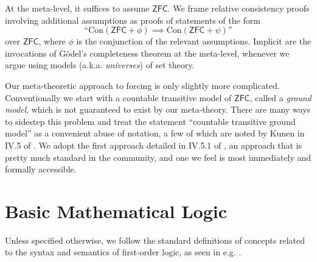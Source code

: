\documentclass[12pt, twoside]{memoir}
\numberwithin{equation}{section}
\theoremstyle{definition}
\theoremstyle{remark}
\theoremstyle{definition}
\theoremstyle{definition}
\theoremstyle{definition}
\theoremstyle{remark}
\begin{document}
At the meta-level, it suffices to assume $\mathsf{ZFC}$. We frame relative consistency proofs involving additional assumptions as proofs of statements of the form $$\text{``}\mathrm{Con}(\mathsf{ZFC} + \phi) \implies \mathrm{Con}(\mathsf{ZFC} + \psi)\text{''}$$ over $\mathsf{ZFC}$, where $\phi$ is the conjunction of the relevant assumptions. Implicit are the invocations of G\"{o}del's completeness theorem at the meta-level, whenever we argue using models (a.k.a. \emph{universes}) of set theory.

Our meta-theoretic approach to forcing is only slightly more complicated. Conventionally we start with a countable transitive model of $\mathsf{ZFC}$, called a \emph{ground model}, which is not guaranteed to exist by our meta-theory. There are many ways to sidestep this problem and treat the statement ``countable transitive ground model'' as a convenient abuse of notation, a few of which are noted by Kunen in IV.5 of \cite{kunen}. We adopt the first approach detailed in IV.5.1 of \cite{kunen}, an approach that is pretty much standard in the community, and one we feel is most immediately and formally accessible.

\section{Basic Mathematical Logic}

Unless specified otherwise, we follow the standard definitions of concepts related to the syntax and semantics of first-order logic, as seen in e.g. \cite{enderton}.
\end{document}
